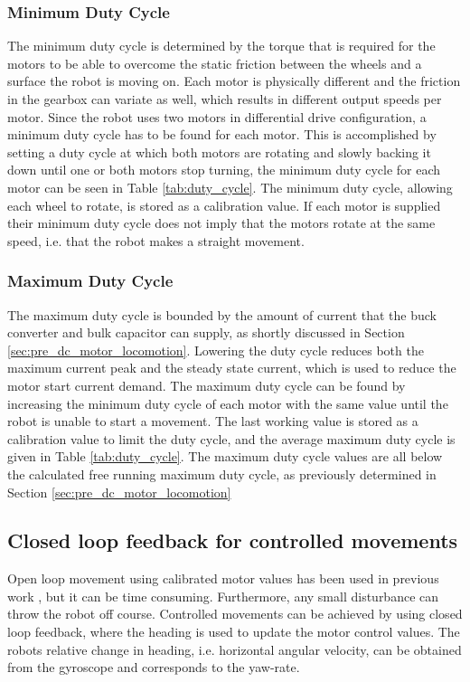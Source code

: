 \subsubsection{Minimum Duty Cycle}

The minimum duty cycle is determined by the torque that is required for the motors to be able to overcome the static friction between the wheels and a surface the robot is moving on.
Each motor is physically different and the friction in the gearbox can variate as well, which results in different output speeds per motor.
Since the robot uses two motors in differential drive configuration, a minimum duty cycle has to be found for each motor.
This is accomplished by setting a duty cycle at which both motors are rotating and slowly backing it down until one or both motors stop turning, the minimum duty cycle for each motor can be seen in Table \ref{tab:duty_cycle}.
The minimum duty cycle, allowing each wheel to rotate, is stored as a calibration value.
If each motor is supplied their minimum duty cycle does not imply that the motors rotate at the same speed, i.e. that the robot makes a straight movement.

\subsubsection{Maximum Duty Cycle}

The maximum duty cycle is bounded by the amount of current that the buck converter and bulk capacitor can supply, as shortly discussed in Section \ref{sec:pre_dc_motor_locomotion}.
Lowering the duty cycle reduces both the maximum current peak and the steady state current, which is used to reduce the motor start current demand.
The maximum duty cycle can be found by increasing the minimum duty cycle of each motor with the same value until the robot is unable to start a movement.
The last working value is stored as a calibration value to limit the duty cycle, and the average maximum duty cycle is given in Table \ref{tab:duty_cycle}.
The maximum duty cycle values are all below the calculated free running maximum duty cycle, as previously determined in Section \ref{sec:pre_dc_motor_locomotion}


\subsection{Closed loop feedback for controlled movements}

Open loop movement using calibrated motor values has been used in previous work \cite{legoc_uist_2016}, but it can be time consuming.
Furthermore, any small disturbance can throw the robot off course.
Controlled movements can be achieved by using closed loop feedback, where the heading is used to update the motor control values.
The robots relative change in heading, i.e. horizontal angular velocity, can be obtained from the gyroscope and corresponds to the yaw-rate.

